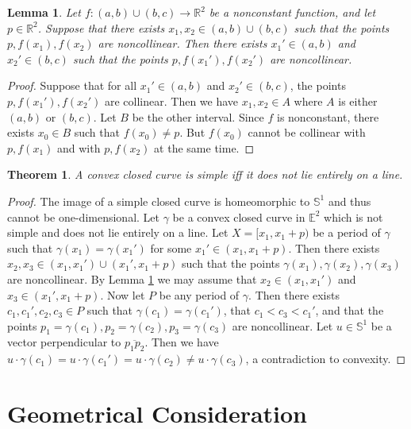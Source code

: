 \documentclass{amsart}
\newtheorem{lemma}[proposition]{Lemma}
\newtheorem{theorem}[proposition]{Theorem}
\theoremstyle{definition}
\theoremstyle{remark}
\begin{document}
\begin{lemma}
    \label{lem}
    Let $f:(a,b)\cup(b,c)\to\mathbb{R}^2$ be a
    nonconstant function, and let $p\in\mathbb{R}^2$.
    Suppose that there exists $x_1,x_2\in(a,b)\cup(b,c)$ such that
    the points $p,f(x_1),f(x_2)$ are noncollinear.
    Then there exists $x_1'\in(a,b)$ and $x_2'\in(b,c)$ such that
    the points $p,f(x_1'),f(x_2')$ are noncollinear.
\end{lemma}

\begin{proof}
    Suppose that for all $x_1'\in(a,b)$ and $x_2'\in(b,c)$,
    the points $p,f(x_1'),f(x_2')$ are collinear.
    Then we have $x_1,x_2\in A$ where
    $A$ is either $(a,b)$ or $(b,c)$. Let $B$ be the other interval.
    Since $f$ is nonconstant, there exists $x_0\in B$
    such that $f(x_0)\ne p$. But $f(x_0)$ cannot be collinear
    with $p,f(x_1)$ and with $p,f(x_2)$ at the same time.
\end{proof}

\begin{theorem}
    \label{thm:main}
    A convex closed curve is simple iff
    it does not lie entirely on a line.
\end{theorem}

\begin{proof}
    The image of a simple closed curve is homeomorphic to
    $\mathbb{S}^1$ and thus cannot be one-dimensional.
    Let $\gamma$ be a convex closed curve in $\mathbb{E}^2$
    which is not simple and does not lie entirely on a line.
    Let $X=[x_1,x_1+p)$ be a period of $\gamma$ such that
    $\gamma(x_1)=\gamma(x_1')$ for some $x_1'\in(x_1,x_1+p)$.
    Then there exists $x_2,x_3\in(x_1,x_1')\cup(x_1',x_1+p)$
    such that the points $\gamma(x_1),\gamma(x_2),\gamma(x_3)$ are
    noncollinear. By Lemma \ref{lem} we may assume that
    $x_2\in(x_1,x_1')$ and $x_3\in(x_1',x_1+p)$.
    Now let $P$ be any period of $\gamma$. Then there exists
    $c_1,c_1',c_2,c_3\in P$ such that $\gamma(c_1)=\gamma(c_1')$,
    that $c_1<c_3<c_1'$, and that the points
    $p_1=\gamma(c_1),p_2=\gamma(c_2),p_3=\gamma(c_3)$ are noncollinear.
    Let $u\in\mathbb{S}^1$ be a vector perpendicular to
    $\overline{p_1p_2}$. Then we have
    $u\cdot\gamma(c_1)=u\cdot\gamma(c_1')=u\cdot\gamma(c_2)
        \ne u\cdot\gamma(c_3)$, a contradiction to convexity.
\end{proof}

\section{Geometrical Consideration}
\end{document}

